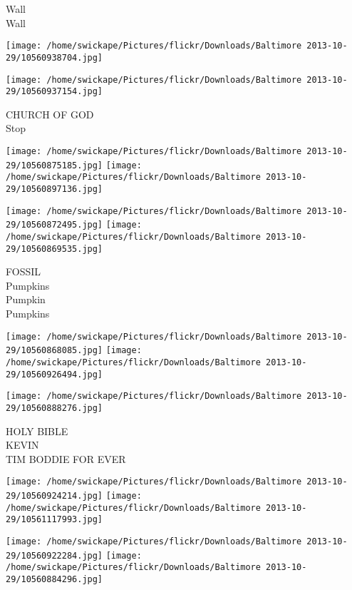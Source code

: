 \documentclass[10pt,letterpaper]{article}
\begin{document}
Wall\\
Wall\\
\pagebreak

\texttt{[image: /home/swickape/Pictures/flickr/Downloads/Baltimore 2013-10-29/10560938704.jpg]}

\vspace{0.25in}
\texttt{[image: /home/swickape/Pictures/flickr/Downloads/Baltimore 2013-10-29/10560937154.jpg]}

CHURCH OF GOD\\
Stop\\
\pagebreak

\texttt{[image: /home/swickape/Pictures/flickr/Downloads/Baltimore 2013-10-29/10560875185.jpg]}
\texttt{[image: /home/swickape/Pictures/flickr/Downloads/Baltimore 2013-10-29/10560897136.jpg]}

\texttt{[image: /home/swickape/Pictures/flickr/Downloads/Baltimore 2013-10-29/10560872495.jpg]}
\texttt{[image: /home/swickape/Pictures/flickr/Downloads/Baltimore 2013-10-29/10560869535.jpg]}

FOSSIL\\
Pumpkins\\
Pumpkin\\
Pumpkins\\
\pagebreak

\texttt{[image: /home/swickape/Pictures/flickr/Downloads/Baltimore 2013-10-29/10560868085.jpg]}
\texttt{[image: /home/swickape/Pictures/flickr/Downloads/Baltimore 2013-10-29/10560926494.jpg]}

\vspace{0.25in}
\texttt{[image: /home/swickape/Pictures/flickr/Downloads/Baltimore 2013-10-29/10560888276.jpg]}

HOLY BIBLE\\
KEVIN\\
TIM BODDIE FOR EVER\\
\pagebreak

\texttt{[image: /home/swickape/Pictures/flickr/Downloads/Baltimore 2013-10-29/10560924214.jpg]}
\texttt{[image: /home/swickape/Pictures/flickr/Downloads/Baltimore 2013-10-29/10561117993.jpg]}

\texttt{[image: /home/swickape/Pictures/flickr/Downloads/Baltimore 2013-10-29/10560922284.jpg]}
\texttt{[image: /home/swickape/Pictures/flickr/Downloads/Baltimore 2013-10-29/10560884296.jpg]}
\end{document}
